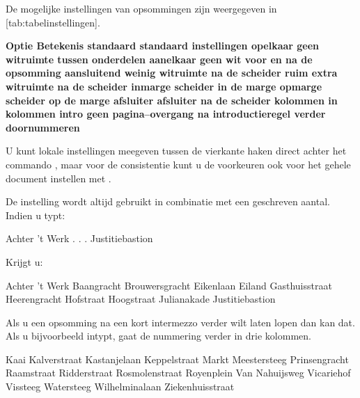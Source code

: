 \haalbuffer

De mogelijke instellingen van opsommingen zijn weergegeven in
[tab:tabelinstellingen].

\starttabel[|l|l|]
\HL
\NC \bf Optie   \NC \bf Betekenis                             \NC\SR
\HL
\NC standaard   \NC standaard instellingen                    \NC\FR
\NC opelkaar    \NC geen witruimte tussen onderdelen          \NC\MR
\NC aanelkaar   \NC geen wit voor en na de opsomming          \NC\MR
\NC aansluitend \NC weinig witruimte na de scheider           \NC\MR
\NC ruim        \NC extra witruimte na de scheider            \NC\MR
\NC inmarge     \NC scheider in de marge                      \NC\MR
\NC opmarge     \NC scheider op de marge                      \NC\MR
\NC afsluiter   \NC afsluiter na de scheider                  \NC\MR
\NC kolommen    \NC in kolommen                               \NC\MR
\NC intro       \NC geen pagina--overgang na introductieregel \NC\MR
\NC verder      \NC doornummeren                              \NC\LR
\HL
\stoptabel

U kunt lokale instellingen meegeven tussen de vierkante
haken direct achter het commando \type{\startopsomming},
maar voor de consistentie kunt u de voorkeuren ook voor het
gehele document instellen met \type{\stelopsommingin}.

De instelling  wordt altijd gebruikt in
combinatie met een geschreven aantal. Indien u typt:

\startbuffer
{}
\som Achter 't Werk
.
.
.
\som Justitiebastion
\stopopsomming
\stopbuffer

\typebuffer

Krijgt u:

\startbuffer
{}
\som Achter 't Werk
\som Baangracht
\som Brouwersgracht
\som Eikenlaan
\som Eiland
\som Gasthuisstraat
\som Heerengracht
\som Hofstraat
\som Hoogstraat
\som Julianakade
\som Justitiebastion
\stopopsomming
\stopbuffer

\haalbuffer

Als u een opsomming na een kort intermezzo verder wilt laten
lopen dan kan dat. Als u bijvoorbeeld
 intypt,
gaat de nummering verder in drie kolommen.

\startbuffer
{}
\som Kaai
\som Kalverstraat
\som Kastanjelaan
\som Keppelstraat
\som Markt
\som Meestersteeg
\som Prinsengracht
\som Raamstraat
\som Ridderstraat
\som Rosmolenstraat
\som Royenplein
\som Van Nahuijsweg
\som Vicariehof
\som Vissteeg
\som Watersteeg
\som Wilhelminalaan
\som Ziekenhuisstraat
\stopopsomming
\stopbuffer

